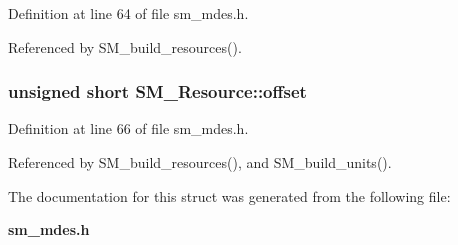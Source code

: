 Definition at line 64 of file sm\_\-mdes.h.

Referenced by SM\_\-build\_\-resources().
\subsubsection{\setlength{\rightskip}{0pt plus 5cm}unsigned short \bf{SM\_\-Resource::offset}}\label{structSM__Resource_5a076ebfcd7a569f4ca7c407d3ddc50f}




Definition at line 66 of file sm\_\-mdes.h.

Referenced by SM\_\-build\_\-resources(), and SM\_\-build\_\-units().

The documentation for this struct was generated from the following file:\begin{CompactItemize}
\item 
\bf{sm\_\-mdes.h}\end{CompactItemize}
